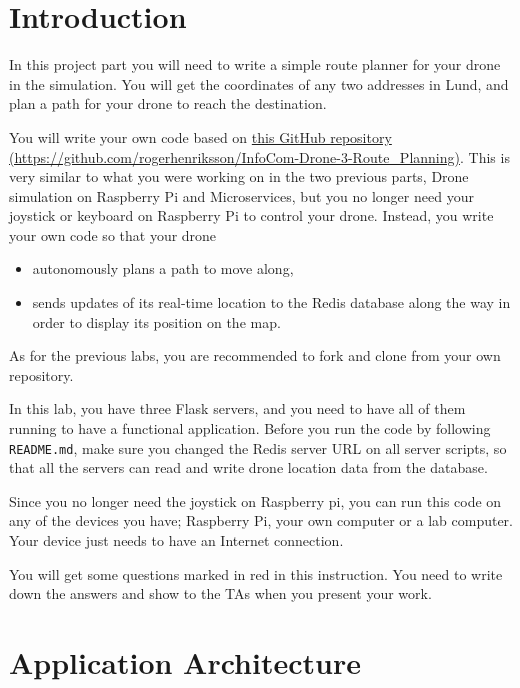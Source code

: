 \documentclass{article}
\begin{document}
\section{Introduction}
In this project part you will need to write a simple route planner for your drone in the simulation. You will get the coordinates of any two addresses in Lund, and plan a path for your drone to reach the destination. 

You will write your own code based on {\color{blue}\href{https://github.com/rogerhenriksson/InfoCom-Drone-3-Route_Planning}{this GitHub repository (https://github.com/rogerhenriksson/InfoCom-Drone-3-Route\_Planning)}}. This is very similar to what you were working on in the two previous parts, Drone simulation on Raspberry Pi and Microservices, but you no longer need your joystick or keyboard on Raspberry Pi to control your drone. Instead, you write your own code so that your drone
\begin{itemize}
    \item autonomously plans a path to move along,
    \item sends updates of its real-time location to the Redis database along the way in order to display its position on the map.
\end{itemize}
As for the previous labs, you are recommended to fork and clone from your own repository.

In this lab, you have three Flask servers, and you need to have all of them running to have a functional application. Before you run the code by following \verb!README.md!, make sure you changed the Redis server URL on all server scripts, so that all the servers can read and write drone location data from the database.

Since you no longer need the joystick on Raspberry pi, you can run this code on any of the devices you have; Raspberry Pi, your own computer or a lab computer. Your device just needs to have an Internet connection.\vspace{0.3cm}

\parbox[t]{14cm}{{You will get some questions marked in red in this instruction. You need to write down the answers and show to the TAs when you present your work.}}\vspace{0.2cm}

\section{Application Architecture}
\end{document}
